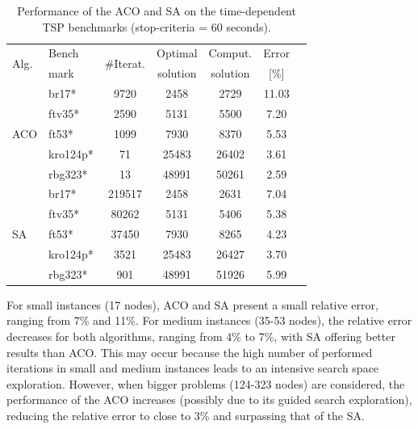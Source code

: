 \documentclass[onecolumn]{elsarticle}
\begin{document}
\begin{table}
    \centering
    \caption{Performance of the ACO and SA on the time-dependent TSP benchmarks (stop-criteria = 60 seconds).}
    \label{tab:tdtsp_results}
    \begin{tabular}{@{}l l@{}c c c c c@{}}
    \hline
    \multirow{2}{*}{Alg.}& Bench   & \multirow{2}{*}{\#Iterat.}  & Optimal  & Comput.  & Error  \\ 
                         & mark    &                             & solution & solution &  [\%]  \\ \hline
    \multirow{5}{*}{ACO} & br17*    & 9720    & 2458        & 2729                 & 11.03          \\  
                         & ftv35*   & 2590    & 5131       & 5500              & 7.20       \\  
                         & ft53*    & 1099     & 7930      & 8370               & 5.53      \\ 
                         & kro124p*  & 71     & 25483     & 26402         & 3.61     \\   
                         & rbg323*  & 13      & 48991      & 50261                & 2.59      \\ \hline
    \multirow{5}{*}{SA}  & br17*    & 219517  & 2458        & 2631             & 7.04          \\  
                         & ftv35*   & 80262   & 5131      & 5406			  & 5.38      \\  
                         & ft53*    & 37450   & 7930      & 8265           & 4.23      \\  
                         & kro124p*  & 3521    & 25483     & 26427         & 3.70     \\  
                         & rbg323*  & 901    & 48991      & 51926              & 5.99      \\ \hline
    \end{tabular}
\end{table}

For small instances (17 nodes), ACO and SA present a small relative error, ranging from 7\% and 11\%. For medium instances (35-53 nodes), the relative error decreases for both algorithms, ranging from 4\% to 7\%, with SA offering better results than ACO. This may occur because the high number of performed iterations in small and medium instances leads to an intensive search space exploration. However, when  bigger problems (124-323 nodes) are considered, the performance of the ACO increases (possibly due to its guided search exploration), reducing the relative error to close to 3\% and surpassing that of the SA.
\end{document}
